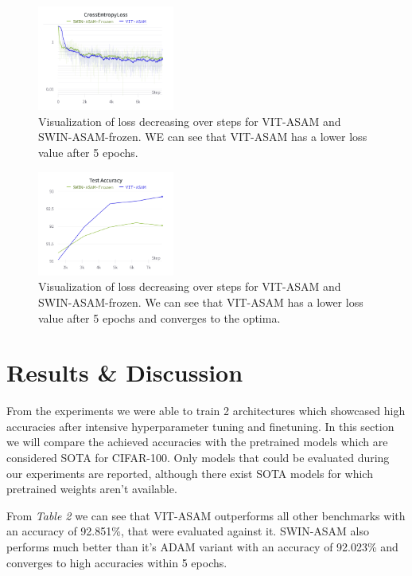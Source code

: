 \documentclass{article}
\begin{document}
\begin{figure}[ht]
    \vskip 0.2in
    \centering
    \includegraphics[width=0.4\textwidth]{cross_entropy_loss.png}
    \caption{Visualization of loss decreasing over steps for VIT-ASAM and SWIN-ASAM-frozen. WE can see that VIT-ASAM has a lower loss value after 5 epochs.}
    \label{fig:foobar}
    \vskip -0.2in
\end{figure}

\begin{figure}[ht]
    \vskip 0.2in
    \centering
    \includegraphics[width=0.4\textwidth]{test_accuracy.png}
    \caption{Visualization of loss decreasing over steps for VIT-ASAM and SWIN-ASAM-frozen. We can see that VIT-ASAM has a lower loss value after 5 epochs and converges to the optima.}
    \label{fig:foobar}
    \vskip -0.2in
\end{figure}

\section{Results \& Discussion}
From the experiments we were able to train 2 architectures which showcased high accuracies after intensive hyperparameter tuning and finetuning.
In this section we will compare the achieved accuracies with the pretrained models which are considered SOTA for CIFAR-100.
Only models that could be evaluated during our experiments are reported, although there exist SOTA models for which pretrained weights aren't available.

From \textit{Table 2} we can see that VIT-ASAM outperforms all other benchmarks with an accuracy of 92.851\%, that were evaluated against it.
SWIN-ASAM also performs much better than it's ADAM variant with an accuracy of 92.023\% and converges to high accuracies within 5 epochs.
\end{document}
